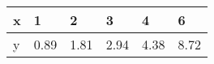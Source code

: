 \documentclass{article}
\begin{document}
\begin{table}[h!]
\begin{tabular}{llllll}

\multicolumn{1}{p{30.865313pt}}{\raggedright x} & \multicolumn{1}{p{30.865313pt}}{\raggedright 1} & \multicolumn{1}{p{32.370937pt}}{\raggedright 2} & \multicolumn{1}{p{30.1125pt}}{\raggedright 3} & \multicolumn{1}{p{30.1125pt}}{\raggedright 4} & \multicolumn{1}{p{30.1125pt}}{\raggedright 6}\\ 
\hline 
\multicolumn{1}{p{30.865313pt}}{\raggedright y} & \multicolumn{1}{p{30.865313pt}}{\raggedright 0.89} & \multicolumn{1}{p{32.370937pt}}{\raggedright 1.81} & \multicolumn{1}{p{30.1125pt}}{\raggedright 2.94} & \multicolumn{1}{p{30.1125pt}}{\raggedright 4.38} & \multicolumn{1}{p{30.1125pt}}{\raggedright 8.72}\\ 


\end{tabular}
\end{table}
\end{document}
